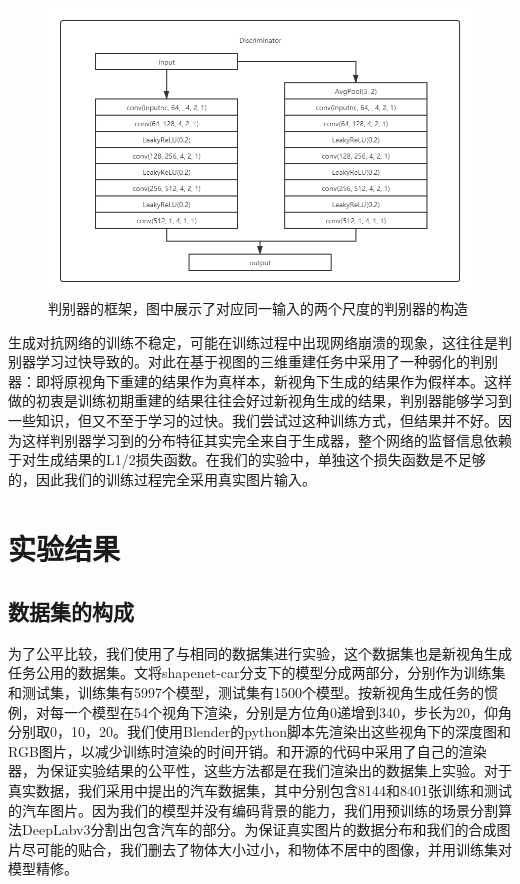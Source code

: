 \documentclass[UTF8,openany,AutoFakeBold,AutoFakeSlant,cs4size]{ctexbook}
\begin{document}
\begin{figure}
\centering
\includegraphics[width=15cm]{./images/discriminator.png}
\caption{判别器的框架，图中展示了对应同一输入的两个尺度的判别器的构造}
\label{fig:sample}
\end{figure}

生成对抗网络的训练不稳定，可能在训练过程中出现网络崩溃的现象，这往往是判别器学习过快导致的。对此\cite{kato2019vpl}在基于视图的三维重建任务中采用了一种弱化的判别器：即将原视角下重建的结果作为真样本，新视角下生成的结果作为假样本。这样做的初衷是训练初期重建的结果往往会好过新视角生成的结果，判别器能够学习到一些知识，但又不至于学习的过快。我们尝试过这种训练方式，但结果并不好。因为这样判别器学习到的分布特征其实完全来自于生成器，整个网络的监督信息依赖于对生成结果的L1/2损失函数。在我们的实验中，单独这个损失函数是不足够的，因此我们的训练过程完全采用真实图片输入。



\clearpage

\chapter{实验结果}

\section{数据集的构成}

为了公平比较，我们使用了与\cite{Zhou2016ViewSB}相同的数据集进行实验，这个数据集也是新视角生成任务公用的数据集。\cite{Zhou2016ViewSB}文将shapenet-car分支下的模型分成两部分，分别作为训练集和测试集，训练集有5997个模型，测试集有1500个模型。按新视角生成任务的惯例，对每一个模型在54个视角下渲染，分别是方位角0递增到340，步长为20，仰角分别取0，10，20。我们使用Blender的python脚本先渲染出这些视角下的深度图和RGB图片，以减少训练时渲染的时间开销。\cite{Zhou2016ViewSB}和\cite{Su2015MultiviewCN}开源的代码中采用了自己的渲染器，为保证实验结果的公平性，这些方法都是在我们渲染出的数据集上实验。对于真实数据，我们采用\cite{6755945}中提出的汽车数据集，其中分别包含8144和8401张训练和测试的汽车图片。因为我们的模型并没有编码背景的能力，我们用预训练的场景分割算法DeepLabv3\cite{Chen2017RethinkingAC}分割出包含汽车的部分。为保证真实图片的数据分布和我们的合成图片尽可能的贴合，我们删去了物体大小过小，和物体不居中的图像，并用训练集对模型精修。
\end{document}
